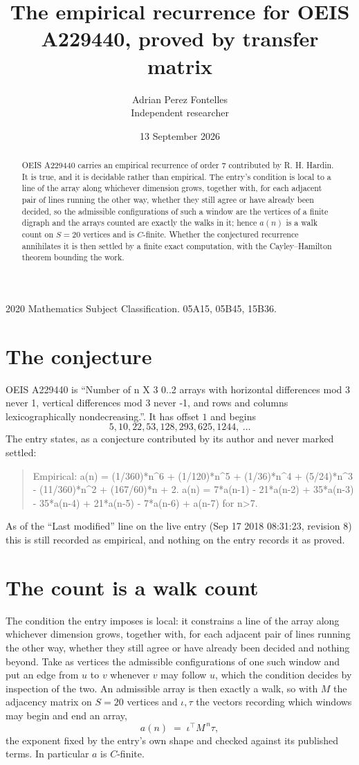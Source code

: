 \documentclass[11pt,a4paper]{article}
\title{The empirical recurrence for OEIS A229440, proved by transfer matrix}
\author{Adrian Perez Fontelles\\ \small Independent researcher}
\date{13 September 2026}
\theoremstyle{plain}
\theoremstyle{definition}
\begin{document}
\maketitle

\begin{abstract}
OEIS A229440 carries an empirical recurrence of order $7$ contributed by R. H. Hardin. It is
true, and it is decidable rather than empirical. The entry's condition is local to a line of the array along whichever dimension grows, together with, for each adjacent pair of lines running the other way, whether they still agree or have already been decided, so
the admissible configurations of such a window are the vertices of a finite digraph and the
arrays counted are exactly the walks in it; hence $a(n)$ is a walk count on $S=20$ vertices
and is $C$-finite. Whether the conjectured recurrence annihilates it is then settled by a
finite exact computation, with the Cayley--Hamilton theorem bounding the work.
\end{abstract}

\noindent\small 2020 Mathematics Subject Classification. 05A15, 05B45, 15B36.\normalsize

\section{The conjecture}

OEIS A229440 is ``Number of n X 3 0..2 arrays with horizontal differences mod 3 never 1, vertical differences mod 3 never -1, and rows and columns lexicographically nondecreasing.''. It has offset $1$ and begins
\[
5, 10, 22, 53, 128, 293, 625, 1244,\ \dots
\]
The entry states, as a conjecture contributed by its author and never marked settled:
\begin{quote}
Empirical: a(n) = (1/360)*n\^{}6 + (1/120)*n\^{}5 + (1/36)*n\^{}4 + (5/24)*n\^{}3 - (11/360)*n\^{}2 + (167/60)*n + 2. a(n) = 7*a(n-1) - 21*a(n-2) + 35*a(n-3) - 35*a(n-4) + 21*a(n-5) - 7*a(n-6) + a(n-7) for n>7.
\end{quote}
As of the ``Last modified'' line on the live entry (Sep 17 2018 08:31:23, revision 8) this is still
recorded as empirical, and nothing on the entry records it as proved.

\section{The count is a walk count}

The condition the entry imposes is local: it constrains a line of the array along whichever dimension grows, together with, for each adjacent pair of lines running the other way, whether they still agree or have already been decided and nothing beyond. Take as
vertices the admissible configurations of one such window and put an edge from $u$ to $v$
whenever $v$ may follow $u$, which the condition decides by inspection of the two. An
admissible array is then exactly a walk, so with $M$ the adjacency matrix on $S=20$ vertices
and $\iota,\tau$ the vectors recording which windows may begin and end an array,
\[
a(n)\;=\;\iota^{\!\top}M^{\,n}\tau ,
\]
the exponent fixed by the entry's own shape and checked against its published terms. In
particular $a$ is $C$-finite.
\end{document}
